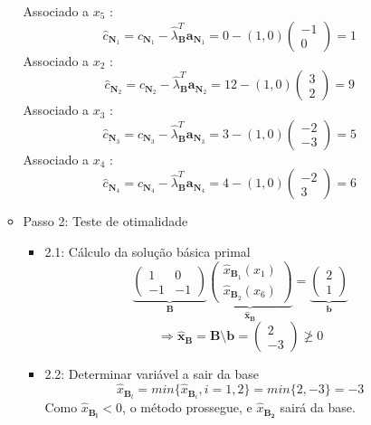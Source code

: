 \documentclass{article}
\begin{document}
\begin{itemize}
\begin{itemize}
Associado a $x_{5}$ :
$$
\hat{c}_{\mathbf{N}_{1}}=c_{\mathbf{N}_{1}}-\hat{\lambda}_{\mathbf{B}}^{T} \mathbf{a}_{\mathbf{N}_{1}}=0-(1,0)
\begin{pmatrix}
-1\\
0
\end{pmatrix}
=1
$$
Associado a $x_{2}$ :
$$
\hat{c}_{\mathbf{N}_{2}}=c_{\mathbf{N}_{2}}-\hat{\lambda}_{\mathbf{B}}^{T} \mathbf{a}_{\mathbf{N}_{2}}=12-(1,0)
\begin{pmatrix}
3\\
2
\end{pmatrix}
=9
$$
Associado a $x_{3}$ :
$$
\hat{c}_{\mathbf{N}_{3}}=c_{\mathbf{N}_{3}}-\hat{\lambda}_{\mathbf{B}}^{T} \mathbf{a}_{\mathbf{N}_{3}}=3-(1,0)
\begin{pmatrix}
-2\\
-3
\end{pmatrix}
=5
$$
Associado a $x_{4}$ :
$$
\hat{c}_{\mathbf{N}_{4}}=c_{\mathbf{N}_{4}}-\hat{\lambda}_{\mathbf{B}}^{T} \mathbf{a}_{\mathbf{N}_{4}}=4-(1,0)
\begin{pmatrix}
-2\\
3
\end{pmatrix}
=6
$$
\item Passo 2: Teste de otimalidade
\begin{itemize}
\item 2.1: Cálculo da solução básica primal
\[
\underbrace{
\begin{pmatrix}
1&0\\
-1&-1
\end{pmatrix}}_{\mathbf{B}}
\underbrace{
\begin{pmatrix}
\hat{x}_{\mathbf{B}_1} (x_1)\\
\hat{x}_{\mathbf{B}_2} (x_6)
\end{pmatrix}}_{\mathbf{\hat{x}_\mathbf{B}}}
=
\underbrace{
\begin{pmatrix}
2\\
1
\end{pmatrix}}_{\mathbf{b}}
\]
\[
\Rightarrow \mathbf{\hat{x}_\mathbf{B}} = \mathbf{B} \setminus \mathbf{b} =
\begin{pmatrix}
2\\
-3
\end{pmatrix}
\ngeq 0
\]
\item 2.2: Determinar variável a sair da base\\
\[
\hat{x}_{\mathbf{B}_l}=min\{ \hat{x}_{\mathbf{B}_i}, i=1,2\}=min\{2, -3\}=-3
\]
Como $\hat{x}_\mathbf{B_l}<0$, o método prossegue, e $\hat{x}_\mathbf{B_2}$ sairá da base.
		\end{itemize}

\end{itemize}
\end{itemize}
\end{document}
